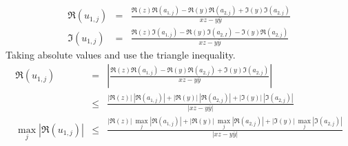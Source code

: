 \begin{eqnarray*}
\Re(u_{1,j}) 
& = &
\frac{ \Re(z) \Re(a_{1,j}) - \Re(y) \Re(a_{2,j}) 
+ \Im(y) \Im(a_{2,j}) }
{ xz - y\overline{y} }
\\
\Im(u_{1,j}) 
& = &
\frac{ \Re(z) \Im(a_{1,j}) - \Re(y) \Im(a_{2,I}) - \Im(y) \Re(a_{2,j}) }
{ xz - y\overline{y} }
\end{eqnarray*}
Taking absolute values and use the triangle inequality.
\begin{eqnarray*}
\Re(u_{1,j}) 
& = &
\left |
\frac{ \Re(z) \Re(a_{1,j}) - \Re(y) \Re(a_{2,j}) 
+ \Im(y) \Im(a_{2,j}) }
{ xz - y\overline{y} }
\right |
\\
& \le &
\frac{
|\Re(z)|\ |\Re(a_{1,j})| + |\Re(y)|\ |\Re(a_{2,j})|
+ |\Im(y)|\ |\Im(a_{2,j})|
} {
\left | xz - y\overline{y} \right |
}
\\
\max_{j} |\Re(u_{1,j})|
& \le &
\frac{
|\Re(z)|\ \max_j|\Re(a_{1,j})| + |\Re(y)|\ \max_j|\Re(a_{2,j})|
+ |\Im(y)|\ \max_j|\Im(a_{2,j})|
} {
\left | xz - y\overline{y} \right |
}
\\
\end{eqnarray*}


